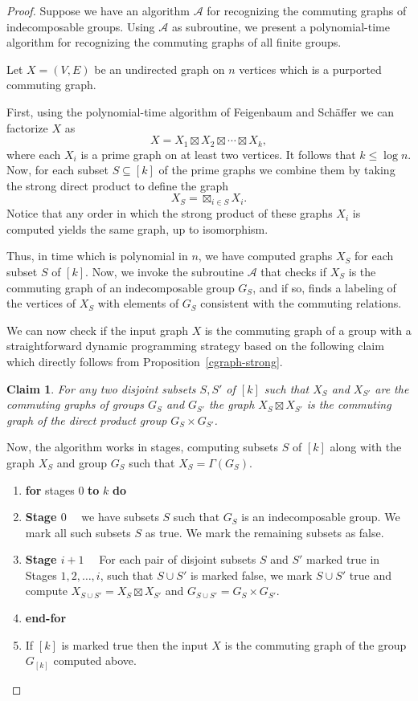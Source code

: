 \documentclass{elsarticle}
\newtheorem{claim}[theorem]{Claim}
\begin{document}
\begin{proof}
  Suppose we have an algorithm $\mathcal{A}$ for recognizing the
  commuting graphs of indecomposable groups. Using $\mathcal{A}$ as
  subroutine, we present a polynomial-time algorithm for recognizing
  the commuting graphs of all finite groups.

  Let $X=(V,E)$ be an undirected graph on $n$ vertices which is a
  purported commuting graph.

  First, using the polynomial-time algorithm of Feigenbaum and
  Sch\"affer \cite{FeSch92} we can factorize $X$ as
  \[
  X=X_1\boxtimes X_2\boxtimes\cdots \boxtimes X_k,
  \]
  where each $X_i$ is a prime graph on at least two vertices.  It
  follows that $k\le\log n$. Now, for each subset $S\subseteq [k]$
  of the prime graphs we combine them by taking the strong
  direct product to define the graph
  \[
  X_S =\boxtimes_{i\in S} X_i.
  \]
  Notice that any order in which the strong product of these graphs
  $X_i$ is computed yields the same graph, up to isomorphism.

  Thus, in time which is polynomial in $n$, we have computed graphs $X_S$ for
  each subset $S$ of $[k]$.  Now, we invoke the subroutine
  $\mathcal{A}$ that checks if $X_S$ is the commuting graph of an
  indecomposable group $G_S$, and if so, finds a labeling of the
  vertices of $X_S$ with elements of $G_S$ consistent with the
  commuting relations.

  We can now check if the input graph $X$ is the commuting graph of a
  group with a straightforward dynamic programming strategy based on
  the following claim which directly follows from
  Proposition~\ref{cgraph-strong}.

\begin{claim}
  For any two disjoint subsets $S,S'$ of $[k]$ such that $X_S$ and
  $X_{S'}$ are the commuting graphs of groups $G_S$ and $G_{S'}$ the
  graph $X_S\boxtimes X_{S'}$ is the commuting graph of the direct
  product group $G_S\times G_{S'}$.
\end{claim}

Now, the algorithm works in stages, computing subsets $S$ of $[k]$
along with the graph $X_S$ and group $G_S$ such that
$X_S=\Gamma(G_S)$.
\begin{enumerate}
\item \textbf{for} stages $0$ \textbf{to} $k$ \textbf{do}
\item \textbf{Stage $0$}~~ we have subsets $S$ such that $G_S$ is an
  indecomposable group. We mark all such subsets $S$ as true. We mark
  the remaining subsets as false.
\item \textbf{Stage $i+1$}~~ For each pair of disjoint subsets $S$ and
  $S'$ marked true in Stages $1,2,\ldots,i$, such that $S\cup S'$ is
  marked false, we mark $S\cup S'$ true and compute $X_{S\cup
    S'}=X_S\boxtimes X_{S'}$ and $G_{S\cup S'}=G_S\times G_{S'}$.
\item \textbf{end-for}
\item If $[k]$ is marked true then the input $X$ is the commuting
  graph of the group $G_{[k]}$ computed above.
\end{enumerate}


\end{proof}
\end{document}
